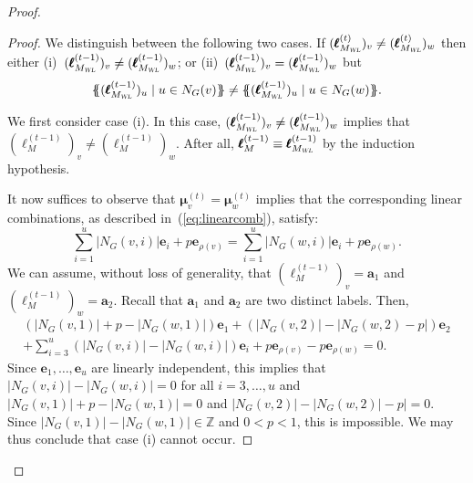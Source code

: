 \begin{proof}
{\begin{proof}
We distinguish between the following two cases. If $ (\pmb{\ell}_{M_{\textsl{WL}}}^{(t)})_v\neq(\pmb{\ell}_{M_{\textsl{WL}}}^{(t)})_w$ then either
(i)~$(\pmb{\ell}_{M_{\textsl{WL}}}^{(t-1)})_v\neq(\pmb{\ell}_{M_{\textsl{WL}}}^{(t-1)})_w$; or 
(ii)~$(\pmb{\ell}_{M_{\textsl{WL}}}^{(t-1)})_v=(\pmb{\ell}_{M_{\textsl{WL}}}^{(t-1)})_w$
but
	$$
	\ldbl (\pmb{\ell}_{M_{\textsl{WL}}}^{(t-1)})_u \st u \in N_G(v) \rdbl\neq
	\ldbl(\pmb{\ell}_{M_{\textsl{WL}}}^{(t-1)})_u \st u \in N_G(w) \rdbl.
	$$
%

We first consider case (i). In this case, $(\pmb{\ell}_{M_{\textsl{WL}}}^{(t-1)})_v\neq(\pmb{\ell}_{M_{\textsl{WL}}}^{(t-1)})_w$ implies that
	$(\pmb{\ell}^{(t-1)}_M)_{v}\neq (\pmb{\ell}_M^{(t-1)})_w$. After all,
	$\pmb{\ell}^{(t-1)}_M\equiv \pmb{\ell}_{M_{\textsl{WL}}}^{(t-1)}$ by the induction hypothesis. 
	
It now suffices to observe that $\pmb{\mu}^{(t)}_{v}=\pmb{\mu}^{(t)}_{w}$ implies that
the corresponding linear combinations, as described in~(\ref{eq:linearcomb}), satisfy:
$$
\sum_{i=1}^u |N_G(v,i)|\mathbf{e}_i + p\mathbf{e}_{\rho(v)}=
\sum_{i=1}^u |N_G(w,i)|\mathbf{e}_i + p\mathbf{e}_{\rho(w)}.
$$
We can assume, without loss of generality,  that $(\pmb{\ell}^{(t-1)}_M)_{v}=\mathbf{a}_1$ and
	$(\pmb{\ell}^{(t-1)}_M)_{w}=\mathbf{a}_2$. Recall that $\mathbf{a}_1$ and $\mathbf{a}_2$ are two distinct labels.
Then,
\begin{multline*}
\left(|N_G(v,1)|+p-|N_G(w,1)|\right)\mathbf{e}_1+
\left(|N_G(v,2)|-|N_G(w,2)-p|\right)\mathbf{e}_2{}\\+
\sum_{i=3}^u \left(|N_G(v,i)|-|N_G(w,i)|\right)\mathbf{e}_i+ p\mathbf{e}_{\rho(v)}  - p \mathbf{e}_{\rho(w)}=0.
\end{multline*}
Since $\mathbf{e}_1,\ldots,\mathbf{e}_u$ are linearly independent, this implies that $|N_G(v,i)|-|N_G(w,i)|=0$
for all $i=3,\ldots,u$ and $|N_G(v,1)|+p-|N_G(w,1)|=0$
and $|N_G(v,2)|-|N_G(w,2)|-p|=0$. Since $|N_G(v,1)|-|N_G(w,1)|\in\mathbb{Z}$ and $0<p<1$, this is impossible. We may thus conclude that case (i) cannot occur.
	


\end{proof}}
\end{proof}
